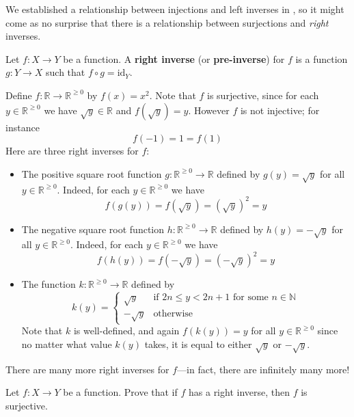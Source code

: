 We established a relationship between injections and left inverses in , so it might come as no surprise that there is a relationship between surjections and \textit{right} inverses.

\begin{definition}
\label{defRightInverse}
Let $f : X \to Y$ be a function. A \textbf{right inverse} (or \textbf{pre-inverse}) for $f$ is a function $g : Y \to X$ such that $f \circ g = \mathrm{id}_Y$.
\end{definition}

\begin{example}
Define $f : \mathbb{R} \to \mathbb{R}^{\ge 0}$ by $f(x)=x^2$. Note that $f$ is surjective, since for each $y \in \mathbb{R}^{\ge 0}$ we have $\sqrt{y} \in \mathbb{R}$ and $f(\sqrt{y}) = y$. However $f$ is not injective; for instance
\[ f(-1) = 1 = f(1) \]
Here are three right inverses for $f$:
\begin{itemize}
\item The positive square root function $g : \mathbb{R}^{\ge 0} \to \mathbb{R}$ defined by $g(y)=\sqrt{y}$ for all $y \in \mathbb{R}^{\ge 0}$. Indeed, for each $y \in \mathbb{R}^{\ge 0}$ we have
\[ f(g(y)) = f(\sqrt{y}) = (\sqrt{y})^2 = y \]
\item The negative square root function $h : \mathbb{R}^{\ge 0} \to \mathbb{R}$ defined by $h(y)=-\sqrt{y}$ for all $y \in \mathbb{R}^{\ge 0}$. Indeed, for each $y \in \mathbb{R}^{\ge 0}$ we have
\[ f(h(y)) = f(-\sqrt{y}) = (-\sqrt{y})^2 = y \]
\item The function $k : \mathbb{R}^{\ge 0} \to \mathbb{R}$ defined by
\[ k(y) = \begin{cases}
\sqrt{y} & \text{if } 2n \le y < 2n+1 \text{ for some } n \in \mathbb{N} \\
-\sqrt{y} & \text{otherwise}
\end{cases} \]
Note that $k$ is well-defined, and again $f(k(y)) = y$ for all $y \in \mathbb{R}^{\ge 0}$ since no matter what value $k(y)$ takes, it is equal to either $\sqrt{y}$ or $-\sqrt{y}$.
\end{itemize}
There are many more right inverses for $f$---in fact, there are infinitely many more!
\end{example}

\begin{exercise}
Let $f : X \to Y$ be a function. Prove that if $f$ has a right inverse, then $f$ is surjective.
\end{exercise}

